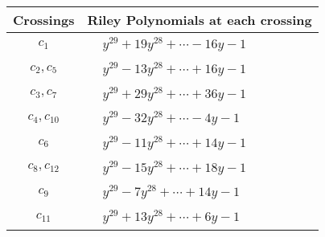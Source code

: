 \documentclass[1p]{elsarticle_modified}
\theoremstyle{definition}
\begin{document}
\begin{tabular}{m{50pt}|m{274pt}}
Crossings & \hspace{64pt}Riley Polynomials at each crossing \\
\hline $$\begin{aligned}c_{1}\end{aligned}$$&$\begin{aligned}
&y^{29}+19 y^{28}+\cdots-16 y-1
\end{aligned}$\\
\hline $$\begin{aligned}c_{2},c_{5}\end{aligned}$$&$\begin{aligned}
&y^{29}-13 y^{28}+\cdots+16 y-1
\end{aligned}$\\
\hline $$\begin{aligned}c_{3},c_{7}\end{aligned}$$&$\begin{aligned}
&y^{29}+29 y^{28}+\cdots+36 y-1
\end{aligned}$\\
\hline $$\begin{aligned}c_{4},c_{10}\end{aligned}$$&$\begin{aligned}
&y^{29}-32 y^{28}+\cdots-4 y-1
\end{aligned}$\\
\hline $$\begin{aligned}c_{6}\end{aligned}$$&$\begin{aligned}
&y^{29}-11 y^{28}+\cdots+14 y-1
\end{aligned}$\\
\hline $$\begin{aligned}c_{8},c_{12}\end{aligned}$$&$\begin{aligned}
&y^{29}-15 y^{28}+\cdots+18 y-1
\end{aligned}$\\
\hline $$\begin{aligned}c_{9}\end{aligned}$$&$\begin{aligned}
&y^{29}-7 y^{28}+\cdots+14 y-1
\end{aligned}$\\
\hline $$\begin{aligned}c_{11}\end{aligned}$$&$\begin{aligned}
&y^{29}+13 y^{28}+\cdots+6 y-1
\end{aligned}$\\
\hline
\end{tabular}\\~\\
\end{document}
